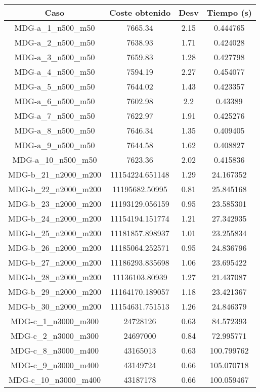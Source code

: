 \documentclass{article}
\begin{document}
\begin{table}[H]
	\centering
	\begin{tabular}{|cccc|}
		\hline
		Caso & Coste obtenido & Desv & Tiempo (s)\\ \hline
		MDG-a\_1\_n500\_m50 & 7665.34 & 2.15 & 0.444765\\
		MDG-a\_2\_n500\_m50 & 7638.93 & 1.71 & 0.424028\\
		MDG-a\_3\_n500\_m50 & 7659.83 & 1.28 & 0.427798\\
		MDG-a\_4\_n500\_m50 & 7594.19 & 2.27 & 0.454077\\
		MDG-a\_5\_n500\_m50 & 7644.02 & 1.43 & 0.423357\\
		MDG-a\_6\_n500\_m50 & 7602.98 & 2.2 & 0.43389\\
		MDG-a\_7\_n500\_m50 & 7622.97 & 1.91 & 0.425276\\
		MDG-a\_8\_n500\_m50 & 7646.34 & 1.35 & 0.409405\\
		MDG-a\_9\_n500\_m50 & 7644.58 & 1.62 & 0.408827\\
		MDG-a\_10\_n500\_m50 & 7623.36 & 2.02 & 0.415836\\
		MDG-b\_21\_n2000\_m200 & 11154224.651148 & 1.29 & 24.167352\\
		MDG-b\_22\_n2000\_m200 & 11195682.50995 & 0.81 & 25.845168\\
		MDG-b\_23\_n2000\_m200 & 11193129.056159 & 0.95 & 23.585301\\
		MDG-b\_24\_n2000\_m200 & 11154194.151774 & 1.21 & 27.342935\\
		MDG-b\_25\_n2000\_m200 & 11181857.898937 & 1.01 & 23.255834\\
		MDG-b\_26\_n2000\_m200 & 11185064.252571 & 0.95 & 24.836796\\
		MDG-b\_27\_n2000\_m200 & 11186293.835698 & 1.06 & 23.695422\\
		MDG-b\_28\_n2000\_m200 & 11136103.80939 & 1.27 & 21.437087\\
		MDG-b\_29\_n2000\_m200 & 11164170.189057 & 1.18 & 23.421367\\
		MDG-b\_30\_n2000\_m200 & 11154631.751513 & 1.26 & 24.846379\\
		MDG-c\_1\_n3000\_m300 & 24728126 & 0.63 & 84.572393\\
		MDG-c\_2\_n3000\_m300 & 24697000 & 0.84 & 72.995771\\
		MDG-c\_8\_n3000\_m400 & 43165013 & 0.63 & 100.799762\\
		MDG-c\_9\_n3000\_m400 & 43149724 & 0.66 & 105.070718\\
		MDG-c\_10\_n3000\_m400 & 43187178 & 0.66 & 100.059467\\

\end{tabular}
\end{table}
\end{document}
